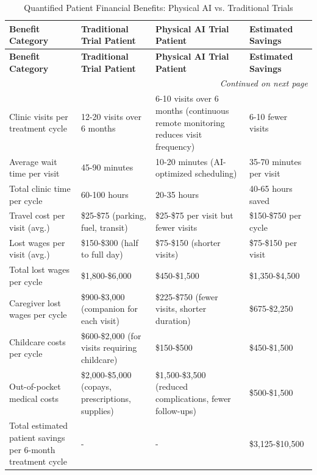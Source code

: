 \begin{longtable}{l p{3.5cm} p{3.5cm} p{2.5cm}}
\caption{Quantified Patient Financial Benefits: Physical AI vs. Traditional Trials}
\label{tab:patient-financial-benefits} \\
\toprule
\textbf{Benefit Category} & \textbf{Traditional Trial Patient} & \textbf{Physical AI Trial Patient} & \textbf{Estimated Savings} \\
\midrule
\endfirsthead
\toprule
\textbf{Benefit Category} & \textbf{Traditional Trial Patient} & \textbf{Physical AI Trial Patient} & \textbf{Estimated Savings} \\
\midrule
\endhead
\midrule
\multicolumn{4}{r}{\textit{Continued on next page}} \\
\bottomrule
\endfoot
\bottomrule
\endlastfoot
Clinic visits per treatment cycle & 12-20 visits over 6 months & 6-10 visits over 6 months (continuous remote monitoring reduces visit frequency) & 6-10 fewer visits \\
\midrule
Average wait time per visit & 45-90 minutes & 10-20 minutes (AI-optimized scheduling) & 35-70 minutes per visit \\
\midrule
Total clinic time per cycle & 60-100 hours & 20-35 hours & 40-65 hours saved \\
\midrule
Travel cost per visit (avg.) & \$25-\$75 (parking, fuel, transit) & \$25-\$75 per visit but fewer visits & \$150-\$750 per cycle \\
\midrule
Lost wages per visit (avg.) & \$150-\$300 (half to full day) & \$75-\$150 (shorter visits) & \$75-\$150 per visit \\
\midrule
Total lost wages per cycle & \$1,800-\$6,000 & \$450-\$1,500 & \$1,350-\$4,500 \\
\midrule
Caregiver lost wages per cycle & \$900-\$3,000 (companion for each visit) & \$225-\$750 (fewer visits, shorter duration) & \$675-\$2,250 \\
\midrule
Childcare costs per cycle & \$600-\$2,000 (for visits requiring childcare) & \$150-\$500 & \$450-\$1,500 \\
\midrule
Out-of-pocket medical costs & \$2,000-\$5,000 (copays, prescriptions, supplies) & \$1,500-\$3,500 (reduced complications, fewer follow-ups) & \$500-\$1,500 \\
\midrule
Total estimated patient savings per 6-month treatment cycle & - & - & \$3,125-\$10,500 \\
\end{longtable}

